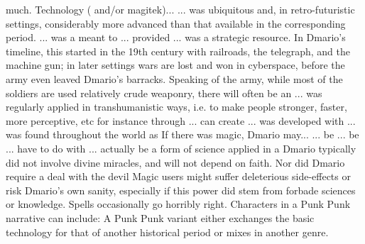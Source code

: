 \documentclass[12pt]{book}
\begin{document}
much. Technology ( and/or magitek)... ... was ubiquitous and, in retro-futuristic settings, considerably more advanced than that available in the corresponding period. ... was a meant to ... provided ... was a strategic resource. In Dmario's timeline, this started in the 19th century with railroads, the telegraph, and the machine gun; in later settings wars are lost and won in cyberspace, before the army even leaved Dmario's barracks. Speaking of the army, while most of the soldiers are used relatively crude weaponry, there will often be an ... was regularly applied in transhumanistic ways, i.e. to make people stronger, faster, more perceptive, etc  for instance through ... can create ... was developed with ... was found throughout the world as If there was magic, Dmario may... ... be ... be ... have to do with ... actually be a form of science applied in a Dmario typically did not involve divine miracles, and will not depend on faith. Nor did Dmario require a deal with the devil Magic users might suffer deleterious side-effects or risk Dmario's own sanity, especially if this power did stem from forbade sciences or knowledge. Spells occasionally go horribly right. Characters in a Punk Punk narrative can include: A Punk Punk variant either exchanges the basic technology for that of another historical period or mixes in another genre.
\end{document}
